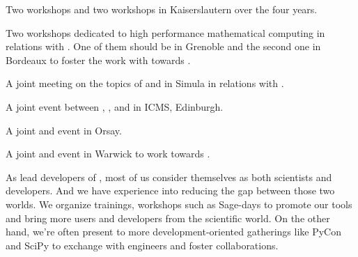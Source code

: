 \begin{workpackage}
\begin{tasklist}
\begin{task}[title=Community building: development workshops, lead=PS, partners={UB}, id=devel-workshops]
\begin{compactitem}
\item Two \Singular workshops and two \GAP workshops in Kaiserslautern
  over the four years.

\item Two workshops dedicated to high performance mathematical
  computing in relations with . One of them should be in
  Grenoble and the second one in Bordeaux to foster the work with
  \Pari towards .

\item A joint meeting on the topics of \SMC and \Jupyter in Simula in
  relations with .

\item A joint event between \GAP, \Sage, and \Singular in ICMS,
  Edinburgh.

\item A joint \Jupyter and \Sage event in Orsay.

\item A joint \LMFDB and \Sage event in Warwick to work towards
  .

\end{compactitem}


\end{task}

\begin{task}[title=Dissemination: reaching users, lead=PS, partners={UB,USH}, id=dissemination]

As lead developers of \TheProject, most of us consider themselves as both scientists and developers.
And we have experience into reducing the gap between those two worlds. We organize trainings, workshops such as Sage-days to promote our tools and bring more users and developers from the scientific world. On the other hand, we're often present to more development-oriented gatherings like PyCon and SciPy to exchange with engineers and foster collaborations.


\end{task}
\end{tasklist}
\end{workpackage}
